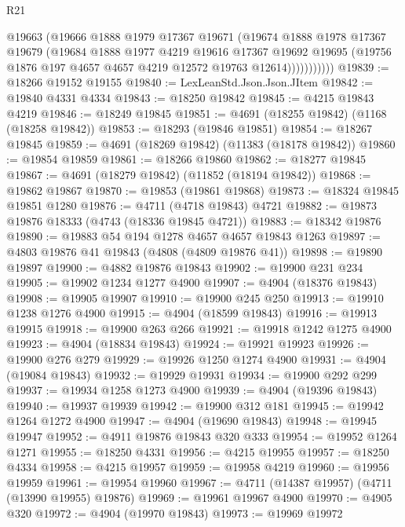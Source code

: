 \begin{lexlean}{R21}
\begin{coremodule}
                  @19663
                  (@19666
                    @1888
                    @1979
                    @17367
                    @19671
                    (@19674
                      @1888
                      @1978
                      @17367
                      @19679
                      (@19684
                        @1888
                        @1977
                        @4219
                        @19616
                        @17367
                        @19692
                        @19695
                        (@19756 @1876 @197 @4657 @4657 @4219 @12572 @19763 @12614)))))))))))
@19839 := @18266 @19152 @19155
@19840 := LexLeanStd.Json.Json.JItem
@19842 := @19840 @4331 @4334
@19843 := @18250 @19842
@19845 := @4215 @19843 @4219
@19846 := @18249 @19845
@19851 := @4691 (@18255 @19842) (@1168 (@18258 @19842))
@19853 := @18293 (@19846 @19851)
@19854 := @18267 @19845
@19859 := @4691 (@18269 @19842) (@11383 (@18178 @19842))
@19860 := @19854 @19859
@19861 := @18266 @19860
@19862 := @18277 @19845
@19867 := @4691 (@18279 @19842) (@11852 (@18194 @19842))
@19868 := @19862 @19867
@19870 := @19853 (@19861 @19868)
@19873 := @18324 @19845 @19851 @1280
@19876 := @4711 (@4718 @19843) @4721
@19882 := @19873 @19876 @18333 (@4743 (@18336 @19845 @4721))
@19883 := @18342 @19876
@19890 := @19883 @54 @194 @1278 @4657 @4657 @19843 @1263
@19897 := @4803 @19876 @41 @19843 (@4808 (@4809 @19876 @41))
@19898 := @19890 @19897
@19900 := @4882 @19876 @19843
@19902 := @19900 @231 @234
@19905 := @19902 @1234 @1277 @4900
@19907 := @4904 (@18376 @19843)
@19908 := @19905 @19907
@19910 := @19900 @245 @250
@19913 := @19910 @1238 @1276 @4900
@19915 := @4904 (@18599 @19843)
@19916 := @19913 @19915
@19918 := @19900 @263 @266
@19921 := @19918 @1242 @1275 @4900
@19923 := @4904 (@18834 @19843)
@19924 := @19921 @19923
@19926 := @19900 @276 @279
@19929 := @19926 @1250 @1274 @4900
@19931 := @4904 (@19084 @19843)
@19932 := @19929 @19931
@19934 := @19900 @292 @299
@19937 := @19934 @1258 @1273 @4900
@19939 := @4904 (@19396 @19843)
@19940 := @19937 @19939
@19942 := @19900 @312 @181
@19945 := @19942 @1264 @1272 @4900
@19947 := @4904 (@19690 @19843)
@19948 := @19945 @19947
@19952 := @4911 @19876 @19843 @320 @333
@19954 := @19952 @1264 @1271
@19955 := @18250 @4331
@19956 := @4215 @19955
@19957 := @18250 @4334
@19958 := @4215 @19957
@19959 := @19958 @4219
@19960 := @19956 @19959
@19961 := @19954 @19960
@19967 := @4711 (@14387 @19957) (@4711 (@13990 @19955) @19876)
@19969 := @19961 @19967 @4900
@19970 := @4905 @320
@19972 := @4904 (@19970 @19843)
@19973 := @19969 @19972

\end{coremodule}
\end{lexlean}
